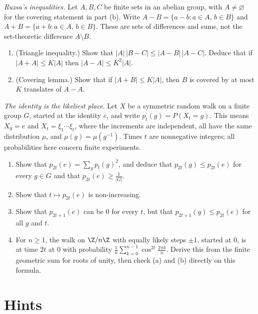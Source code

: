 \begin{exercise}[$\star\star$]\label{pb:ruzsa}
\emph{Ruzsa's inequalities.} Let $A,B,C$ be finite sets in an abelian group, with $A\ne\varnothing$ for the covering statement in part (b). Write $A-B=\{a-b:a\in A,\,b\in B\}$ and $A+B=\{a+b:a\in A,\,b\in B\}$. These are sets of differences and sums, not the set-theoretic difference $A\setminus B$.
\begin{enumerate}[label=(\alph*)]
\item (Triangle inequality.) Show that $|A|\,|B-C|\le|A-B|\,|A-C|$. Deduce that if $|A+A|\le K|A|$ then $|A-A|\le K^2|A|$.
\item (Covering lemma.) Show that if $|A+B|\le K|A|$, then $B$ is covered by at most $K$ translates of $A-A$.
\end{enumerate}
\end{exercise}

\begin{exercise}[$\star\star\star$]\label{pb:returnbound}
\emph{The identity is the likeliest place.} Let $X$ be a symmetric random walk on a finite group $G$, started at the identity $e$,
and write $p_t(g)=P(X_t=g)$. This means $X_0=e$ and $X_t=\xi_1\cdots\xi_t$, where the increments are independent, all have the same distribution $\mu$, and $\mu(g)=\mu(g^{-1})$. Times $t$ are nonnegative integers; all probabilities here concern finite experiments.
\begin{enumerate}[label=(\alph*)]
\item Show that $p_{2t}(e)=\sum_{g}p_t(g)^2$, and deduce that $p_{2t}(g)\le p_{2t}(e)$ for every $g\in G$ and that $p_{2t}(e)\ge\frac1{|G|}$.
\item Show that $t\mapsto p_{2t}(e)$ is non-increasing.
\item Show that $p_{2t+1}(e)$ can be $0$ for every $t$, but that $p_{2t+1}(g)\le p_{2t}(e)$ for all $g$ and $t$.
\item For $n\ge1$, the walk on $\Z/n\Z$ with equally likely steps $\pm1$, started at $0$, is at time $2t$ at $0$ with probability $\frac1n\sum_{k=0}^{n-1}\cos^{2t}\frac{2\pi k}n$. Derive this from the finite geometric sum for roots of unity, then check (a) and
(b) directly on this formula.
\end{enumerate}
\end{exercise}

\section{Hints}

